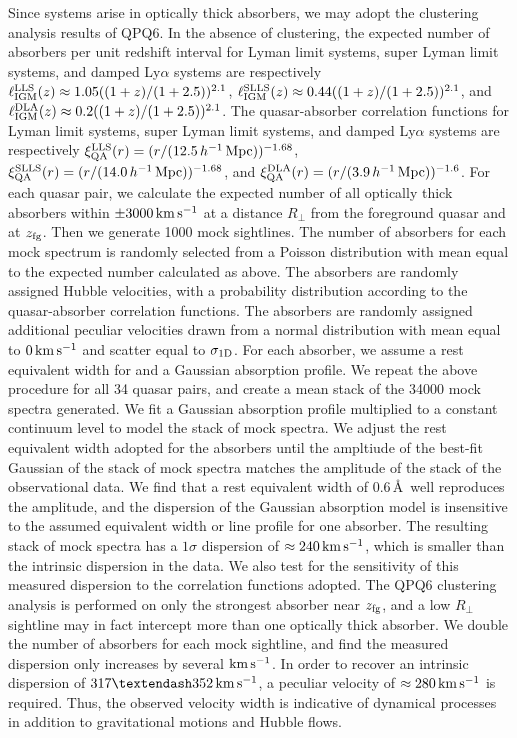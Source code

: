 \documentclass[iop]{emulateapj}
\begin{document}
Since  systems arise in optically thick absorbers, we may adopt the clustering analysis 
results of QPQ6. In the absence of clustering, the expected number of absorbers per unit redshift 
interval for Lyman limit systems, super Lyman limit systems, and damped Ly$\alpha$ systems are 
respectively $\ell_{\rm IGM}^{\rm LLS}(z)\approx1.05((1+z)/(1+2.5))^{2.1}$, 
$\ell_{\rm IGM}^{\rm SLLS}(z)\approx0.44((1+z)/(1+2.5))^{2.1}$, and 
$\ell_{\rm IGM}^{\rm DLA}(z)\approx0.2((1+z)/(1+2.5))^{2.1}$. The quasar-absorber correlation 
functions for Lyman limit systems, super Lyman limit systems, and damped Ly$\alpha$ systems are 
respectively $\xi_{\rm QA}^{\rm LLS}(r)=(r/(12.5\,h^{-1}\,{\rm Mpc}))^{-1.68}$, 
$\xi_{\rm QA}^{\rm SLLS}(r)=(r/(14.0\,h^{-1}\,{\rm Mpc}))^{-1.68}$, and 
$\xi_{\rm QA}^{\rm DLA}(r)=(r/(3.9\,h^{-1}\,{\rm Mpc}))^{-1.6}$. 
For each quasar pair, we calculate the expected number of all optically thick absorbers within 
$\pm3000\,{\rm km\,s^{-1}}$ at a distance $R_\perp$ from the foreground quasar and at 
$z_{\rm fg}$. Then we generate 1000 mock sightlines. The number of absorbers for each mock 
spectrum is randomly selected from a Poisson distribution with mean equal to the expected number 
calculated as above. The absorbers are randomly assigned Hubble velocities, with a probability 
distribution according to the quasar-absorber correlation functions. The absorbers are randomly 
assigned additional peculiar velocities drawn from a normal distribution with mean equal to 
$0\,{\rm km\,s^{-1}}$ and scatter equal to $\sigma_{\rm 1D}$. For each absorber, we 
assume a rest equivalent width for  and a Gaussian absorption profile. We repeat the 
above procedure for all 34 quasar pairs, and create a mean stack of the 34000 mock spectra 
generated. We fit a Gaussian absorption profile multiplied to a constant continuum level to model 
the stack of mock spectra. We adjust the rest equivalent width adopted for the  
absorbers until the ampltiude of the best-fit Gaussian of the stack of mock spectra matches the 
amplitude of the stack of the observational data. We find that a rest equivalent width of 
0.6\,\AA\ well reproduces the amplitude, and the dispersion of the Gaussian absorption model is 
insensitive to the assumed equivalent width or line profile for one absorber. The resulting 
stack of mock spectra has a $1\sigma$ dispersion of $\approx240\,{\rm km\,s^{-1}}$, which is 
smaller than the intrinsic dispersion in the data. We also test for the sensitivity of this 
measured dispersion to the correlation functions adopted. The QPQ6 clustering analysis is 
performed on only the strongest absorber near $z_{\rm fg}$, and a low $R_\perp$ sightline may in 
fact intercept more than one optically thick absorber. We double the number of absorbers for each 
mock sightline, and find the measured dispersion only increases by several ${\rm km\,s^{-1}}$. 
In order to recover an intrinsic dispersion of $317\textendash352\,{\rm km\,s^{-1}}$, a peculiar 
velocity of $\approx280\,{\rm km\,s^{-1}}$ is required. Thus, the observed velocity width is 
indicative of dynamical processes in addition to gravitational motions and Hubble flows. 
\end{document}
